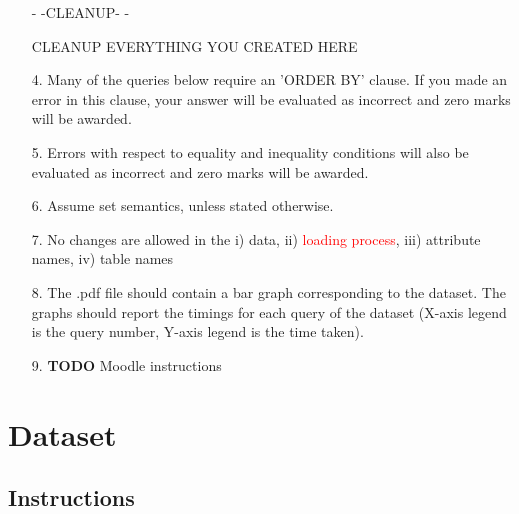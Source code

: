 \documentclass[10pt]{article}
\begin{document}
\begin{itemize}
- -CLEANUP- -

CLEANUP EVERYTHING YOU CREATED HERE

\item[4.] Many of the queries below require an 'ORDER BY' clause. If you made an error in this clause, your answer will be evaluated as incorrect and zero marks will be awarded. 

\item[5.] Errors with respect to equality and inequality conditions will also be evaluated as incorrect and zero marks will be awarded. 

\item[6.] Assume set semantics, unless stated otherwise.

\item[7.] No changes are allowed in the i) data, ii) \textcolor{red}{loading process}, iii) attribute names, iv) table names

\item[8.] The .pdf file should contain a bar graph corresponding to the dataset. The graphs should report the timings for each query of the dataset (X-axis legend is the query number, Y-axis legend is the time taken).

\item[9.] \textbf{TODO} Moodle instructions
\end{itemize}
\section{Dataset}

\subsection{Instructions}
\end{document}
